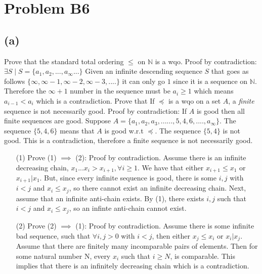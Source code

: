 \documentclass[12pt]{article}
\begin{document}
\section*{Problem B6}
\subsection*{(a)}
Prove that the standard total ordering $\leq$ on $\mathbb{N}$ is a wqo.
\newline
\indent
Proof by contradiction: $\exists S \mid S = \{a_1, a_2, ... , a_\infty ...\}$
Given an infinite descending sequence $S$ that goes as follows
$\{\infty , \infty - 1, \infty -2, \infty-3, ....\}$ it can only go $1$
since it is a sequence on $\mathbb{N}$. Therefore the $\infty+1$ number in the
sequence must be $a_i \ge 1$ which means $a_{i-1} < a_i$
which is a contradiction.
\newline
Prove that If  $\preceq$ is a wqo on a set $A$, a {\it finite\/}
sequence is not  necessarily good.\newline
\indent Proof by contradiction:
If $A$ is good then all finite sequences are good.
Suppose $A = \{a_1 , a_2 , a_3 , ...... , 5 , 4 , 6 , .... , a_\infty\}$. 
The sequence $\{5,4,6\}$ means that $A$ is good w.r.t $\preceq$.
The sequence $\{5,4\}$ is not good.
This is a contradiction, therefore a finite sequence is not necessarily good.
\begin{enumerate}
\item[(1)]
Prove (1) $\implies$ (2): Proof by contradiction.
\newline
Assume there is an infinite decreasing chain, $x_1...x_i > x_{i+1}, \forall 
i\ge 1$. We have that either $x_{i+1} \le x_1$ or $x_{i+1}|x_1$. But, since 
every infinite sequence is good,
there is some $i,j$ with $i < j$ and $x_i \le x_j$,
so there cannot exist an infinite decreasing chain.
Next, assume that an infinite anti-chain exists. By (1), there exists 
$i,j$ such that $i <j$ and $x_i \le x_j$, so an infinte anti-chain
cannot exist.
\item[(2)]
Prove (2) $\implies$ (1): Proof by contradiction.
\newline
Assume there is some infinite bad sequence,
such that $\forall i,j > 0$ with $i <j$, then either
$x_j \le x_i$ or $x_i|x_j$.
Assume that there are finitely many incomparable pairs of elements.
Then for some natural number N, every $x_i$ such that $i \ge N$, is comparable.
This implies that there is an infinitely
decreasing chain which is a contradiction.
\end{enumerate}
\end{document}
